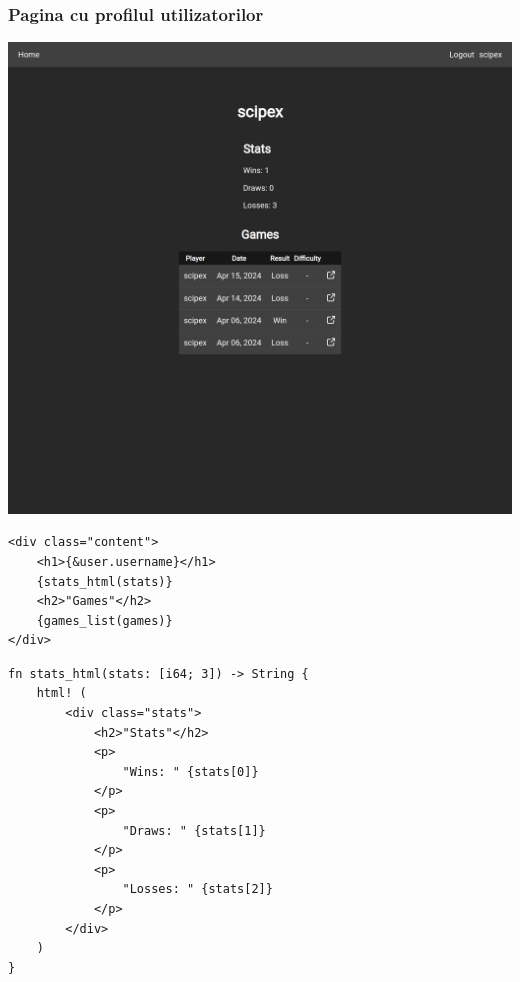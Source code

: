 \vspace{3cm}
\subsubsection{Pagina cu profilul utilizatorilor}

\vspace{1cm}
\begin{center}
	\includegraphics[width=15cm]{3/frontend/userprofile.png}
\end{center}
\vspace{1cm}

\begin{lstlisting}[language=RustHtml]
<div class="content">
    <h1>{&user.username}</h1>
    {stats_html(stats)}
    <h2>"Games"</h2>
    {games_list(games)}
</div>
\end{lstlisting}

\begin{lstlisting}[language=RustHtml]
fn stats_html(stats: [i64; 3]) -> String {
    html! (
        <div class="stats">
            <h2>"Stats"</h2>
            <p>
                "Wins: " {stats[0]}
            </p>
            <p>
                "Draws: " {stats[1]}
            </p>
            <p>
                "Losses: " {stats[2]}
            </p>
        </div>
    )
}
\end{lstlisting}
